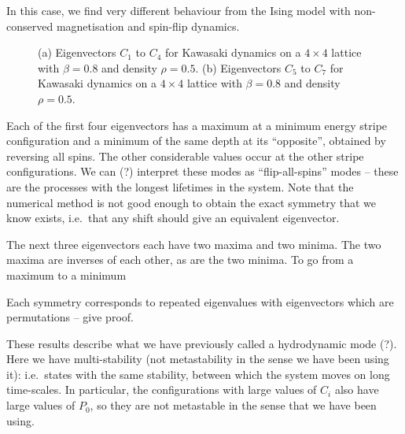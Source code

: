 \documentclass[10pt]{article}
\newcommand{\scalefig}[2]{\texttt{[image: \#2]}}
\newcommand{\Peq}{P_0}
\begin{document}
In this case, we find very different behaviour from the Ising model with
non-conserved magnetisation and spin-flip dynamics.

\begin{figure}
\caption{(a) Eigenvectors $C_1$ to $C_4$ for Kawasaki dynamics on a
$4\times4$ lattice with $\beta=0.8$ and density $\rho = 0.5$. (b) Eigenvectors
$C_5$ to $C_7$ for Kawasaki dynamics on a
$4\times4$ lattice with $\beta=0.8$ and density $\rho = 0.5$. }
\label{fig:kawasaki-C1to4}
\end{figure}


Each of the first four eigenvectors has a maximum at a minimum energy stripe
configuration and
a minimum of the same depth at its ``opposite'', obtained by reversing all
spins. The other considerable values occur at the other stripe configurations.
We can (?) interpret these modes as ``flip-all-spins'' modes -- these are the
processes with the longest lifetimes in the system.  Note that the numerical
method is not good enough to obtain the exact symmetry that we know exists,
i.e.\ that any shift should give an equivalent eigenvector.

% 

The next three eigenvectors each have two maxima and two minima.  The two
maxima are inverses of each other, as are the two minima.  To go from a maximum
to a minimum




Each symmetry corresponds to repeated eigenvalues with eigenvectors which are
permutations -- give proof.

These results describe what we have previously called a hydrodynamic mode (?). 
Here we have multi-stability (not metastability
in the sense we have been using it): i.e.\
states with the same stability, between which the system moves on
long time-scales.  In particular, the configurations with large values of $C_i$
also have large values of $\Peq$, so they are not metastable in the sense that
we have been using.
% 
\end{document}
